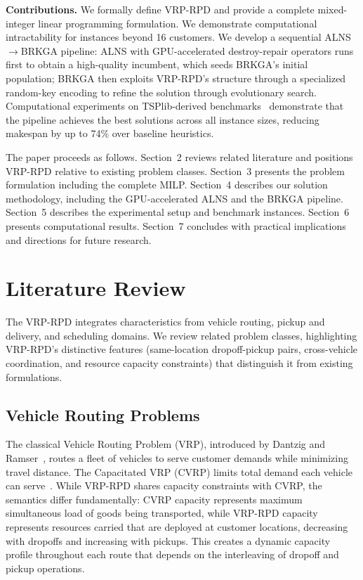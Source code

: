 \documentclass{article}
\begin{document}
\textbf{Contributions.} We formally define VRP-RPD and provide a complete mixed-integer linear programming formulation. We demonstrate computational intractability for instances beyond 16 customers. We develop a sequential ALNS$\to$BRKGA pipeline: ALNS with GPU-accelerated destroy-repair operators runs first to obtain a high-quality incumbent, which seeds BRKGA's initial population; BRKGA then exploits VRP-RPD's structure through a specialized random-key encoding to refine the solution through evolutionary search. Computational experiments on TSPlib-derived benchmarks~\cite{reinelt1991tsplib} demonstrate that the pipeline achieves the best solutions across all instance sizes, reducing makespan by up to 74\% over baseline heuristics.

The paper proceeds as follows. Section~2 reviews related literature and positions VRP-RPD relative to existing problem classes. Section~3 presents the problem formulation including the complete MILP. Section~4 describes our solution methodology, including the GPU-accelerated ALNS and the BRKGA pipeline. Section~5 describes the experimental setup and benchmark instances. Section~6 presents computational results. Section~7 concludes with practical implications and directions for future research.

\section{Literature Review}

The VRP-RPD integrates characteristics from vehicle routing, pickup and delivery, and scheduling domains. We review related problem classes, highlighting VRP-RPD's distinctive features (same-location dropoff-pickup pairs, cross-vehicle coordination, and resource capacity constraints) that distinguish it from existing formulations.

\subsection{Vehicle Routing Problems}

The classical Vehicle Routing Problem (VRP), introduced by Dantzig and Ramser~\cite{dantzig1959truck}, routes a fleet of vehicles to serve customer demands while minimizing travel distance. The Capacitated VRP (CVRP) limits total demand each vehicle can serve~\cite{toth2014vehicle}. While VRP-RPD shares capacity constraints with CVRP, the semantics differ fundamentally: CVRP capacity represents maximum simultaneous load of goods being transported, while VRP-RPD capacity represents resources carried that are deployed at customer locations, decreasing with dropoffs and increasing with pickups. This creates a dynamic capacity profile throughout each route that depends on the interleaving of dropoff and pickup operations.
\end{document}
